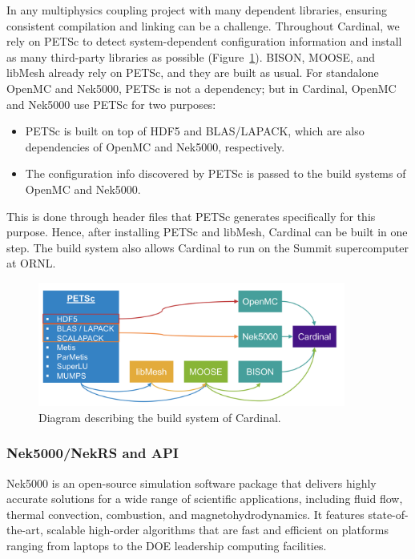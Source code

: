 In any multiphysics coupling project with many dependent libraries, ensuring consistent compilation and linking can be a challenge. Throughout Cardinal, we rely on PETSc to detect system-dependent configuration information and install as many third-party libraries as possible (Figure~\ref{f:build}). BISON, MOOSE, and libMesh already rely on PETSc, and they are built as usual. For standalone OpenMC and
Nek5000, PETSc is not a dependency; but in Cardinal, OpenMC and Nek5000 use PETSc for two purposes:
\begin{itemize}
\item PETSc is built on top of HDF5 and BLAS/LAPACK, which are also dependencies of OpenMC and Nek5000, respectively.
\item The configuration info discovered by PETSc is passed to the build systems of OpenMC and Nek5000.
\end{itemize}
This is done through header files that PETSc generates specifically for this purpose. Hence, after installing PETSc and libMesh, Cardinal can be built in one step.
The build system also allows Cardinal to run on the Summit supercomputer at ORNL.
\begin{figure}[!h]
\centering
\includegraphics[clip=true,width=0.9\textwidth]{Figures/build}
\caption{Diagram describing the build system of Cardinal.}
\label{f:build}
\end{figure}

\subsubsection{Nek5000/NekRS and API}

Nek5000 \cite{fischer2015nek5000} is an open-source simulation software package
that delivers highly accurate solutions for a wide range of scientific
applications, including fluid flow, thermal convection, combustion, and
magnetohydrodynamics. It features state-of-the-art, scalable high-order
algorithms that are fast and efficient on platforms ranging from laptops to the
DOE leadership computing facilities.

